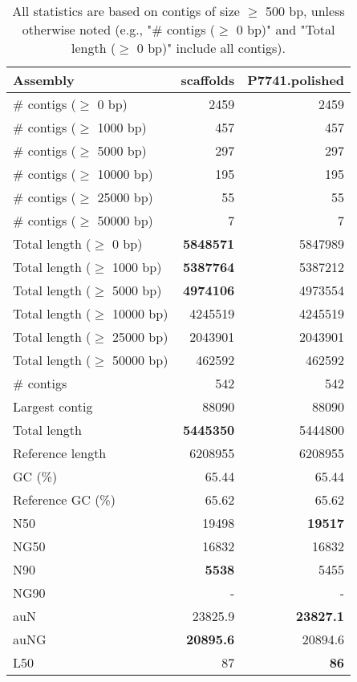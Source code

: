 \documentclass[12pt,a4paper]{article}
\begin{document}
\begin{table}[ht]
\begin{center}
\caption{All statistics are based on contigs of size $\geq$ 500 bp, unless otherwise noted (e.g., "\# contigs ($\geq$ 0 bp)" and "Total length ($\geq$ 0 bp)" include all contigs).}
\begin{tabular}{|l*{2}{|r}|}
\hline
Assembly & scaffolds & P7741.polished \\ \hline
\# contigs ($\geq$ 0 bp) & 2459 & 2459 \\ \hline
\# contigs ($\geq$ 1000 bp) & 457 & 457 \\ \hline
\# contigs ($\geq$ 5000 bp) & 297 & 297 \\ \hline
\# contigs ($\geq$ 10000 bp) & 195 & 195 \\ \hline
\# contigs ($\geq$ 25000 bp) & 55 & 55 \\ \hline
\# contigs ($\geq$ 50000 bp) & 7 & 7 \\ \hline
Total length ($\geq$ 0 bp) & {\bf 5848571} & 5847989 \\ \hline
Total length ($\geq$ 1000 bp) & {\bf 5387764} & 5387212 \\ \hline
Total length ($\geq$ 5000 bp) & {\bf 4974106} & 4973554 \\ \hline
Total length ($\geq$ 10000 bp) & 4245519 & 4245519 \\ \hline
Total length ($\geq$ 25000 bp) & 2043901 & 2043901 \\ \hline
Total length ($\geq$ 50000 bp) & 462592 & 462592 \\ \hline
\# contigs & 542 & 542 \\ \hline
Largest contig & 88090 & 88090 \\ \hline
Total length & {\bf 5445350} & 5444800 \\ \hline
Reference length & 6208955 & 6208955 \\ \hline
GC (\%) & 65.44 & 65.44 \\ \hline
Reference GC (\%) & 65.62 & 65.62 \\ \hline
N50 & 19498 & {\bf 19517} \\ \hline
NG50 & 16832 & 16832 \\ \hline
N90 & {\bf 5538} & 5455 \\ \hline
NG90 & - & - \\ \hline
auN & 23825.9 & {\bf 23827.1} \\ \hline
auNG & {\bf 20895.6} & 20894.6 \\ \hline
L50 & 87 & {\bf 86} \\ \hline

\end{tabular}
\end{center}
\end{table}
\end{document}
